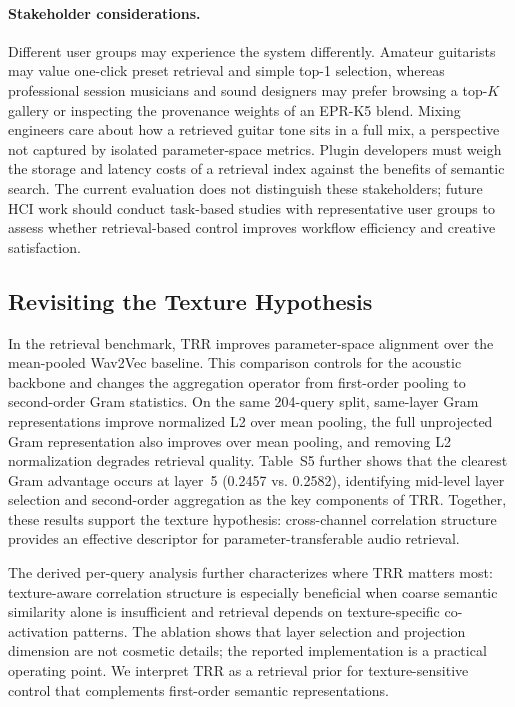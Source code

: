 \paragraph{Stakeholder considerations.} Different user groups may experience the system differently. Amateur guitarists may value one-click preset retrieval and simple top-1 selection, whereas professional session musicians and sound designers may prefer browsing a top-$K$ gallery or inspecting the provenance weights of an EPR-K5 blend. Mixing engineers care about how a retrieved guitar tone sits in a full mix, a perspective not captured by isolated parameter-space metrics. Plugin developers must weigh the storage and latency costs of a retrieval index against the benefits of semantic search. The current evaluation does not distinguish these stakeholders; future HCI work should conduct task-based studies with representative user groups to assess whether retrieval-based control improves workflow efficiency and creative satisfaction.

\subsection{Revisiting the Texture Hypothesis}

In the retrieval benchmark, TRR improves parameter-space alignment over the mean-pooled Wav2Vec baseline. This comparison controls for the acoustic backbone and changes the aggregation operator from first-order pooling to second-order Gram statistics. On the same 204-query split, same-layer Gram representations improve normalized L2 over mean pooling, the full unprojected Gram representation also improves over mean pooling, and removing L2 normalization degrades retrieval quality. Table~S5 further shows that the clearest Gram advantage occurs at layer~5 (0.2457 vs. 0.2582), identifying mid-level layer selection and second-order aggregation as the key components of TRR. Together, these results support the texture hypothesis: cross-channel correlation structure provides an effective descriptor for parameter-transferable audio retrieval.

The derived per-query analysis further characterizes where TRR matters most: texture-aware correlation structure is especially beneficial when coarse semantic similarity alone is insufficient and retrieval depends on texture-specific co-activation patterns. The ablation shows that layer selection and projection dimension are not cosmetic details; the reported implementation is a practical operating point. We interpret TRR as a retrieval prior for texture-sensitive control that complements first-order semantic representations.

